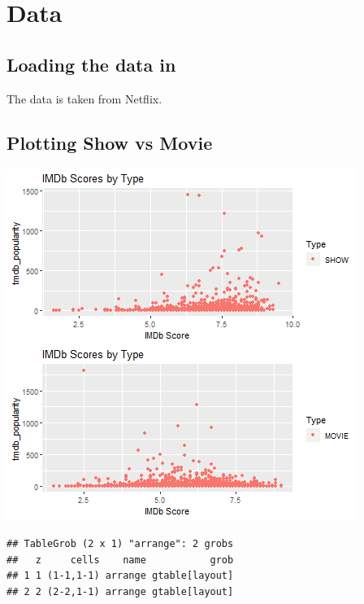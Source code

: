 \documentclass[11pt,preprint, authoryear]{elsarticle}
\let\origfigure\figure
\let\endorigfigure\endfigure
\renewenvironment{figure}[1][2] {
    \expandafter\origfigure\expandafter[H]
} {
    \endorigfigure
}
\numberwithin{equation}{section}
\numberwithin{figure}{section}
\numberwithin{table}{section}
\begin{document}
\hypertarget{data}{%
\section{Data}\label{data}}

\hypertarget{loading-the-data-in}{%
\subsection{Loading the data in}\label{loading-the-data-in}}

The data is taken from Netflix.

\hypertarget{plotting-show-vs-movie}{%
\subsection{Plotting Show vs Movie}\label{plotting-show-vs-movie}}

\begin{figure}[H]

{\centering \includegraphics{Question-4_files/figure-latex/Figure 1-1} 

}

\caption{Show vs movie \label{Figure1}}\label{fig:Figure 1}
\end{figure}

\begin{verbatim}
## TableGrob (2 x 1) "arrange": 2 grobs
##   z     cells    name           grob
## 1 1 (1-1,1-1) arrange gtable[layout]
## 2 2 (2-2,1-1) arrange gtable[layout]
\end{verbatim}
\end{document}
